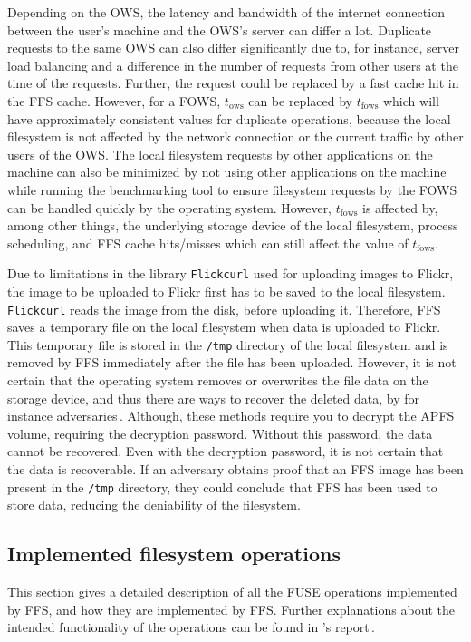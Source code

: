 Depending on the \gls{OWS}, the latency and bandwidth of the internet connection between the user's machine and the \gls{OWS}'s server can differ a lot. Duplicate requests to the same \gls{OWS} can also differ significantly due to, for instance, server load balancing and a difference in the number of requests from other users at the time of the requests. Further, the request could be replaced by a fast cache hit in the \gls{FFS} cache. However, for a \gls{FOWS}, $t_\text{ows}$ can be replaced by $t_\text{fows}$ which will have approximately consistent values for duplicate operations, because the local filesystem is not affected by the network connection or the current traffic by other users of the \gls{OWS}. The local filesystem requests by other applications on the machine can also be minimized by not using other applications on the machine while running the benchmarking tool to ensure filesystem requests by the \gls{FOWS} can be handled quickly by the operating system. However, $t_\text{fows}$ is affected by, among other things, the underlying storage device of the local filesystem, process scheduling, and \gls{FFS} cache hits/misses which can still affect the value of $t_\text{fows}$.

Due to limitations in the library \texttt{Flickcurl} used for uploading images to Flickr, the image to be uploaded to Flickr first has to be saved to the local filesystem. \texttt{Flickcurl} reads the image from the disk, before uploading it. Therefore, \gls{FFS} saves a temporary file on the local filesystem when data is uploaded to Flickr. This temporary file is stored in the \texttt{/tmp} directory of the local filesystem and is removed by \gls{FFS} immediately after the file has been uploaded. However, it is not certain that the operating system removes or overwrites the file data on the storage device, and thus there are ways to recover the deleted data, by for instance adversaries\,\cite{llcsysdevlaboratoriesHowRecoverData2022,cedricAPFSDataRecovery2022,santosHowRecoverData2021}. Although, these methods require you to decrypt the \gls{APFS} volume, requiring the decryption password. Without this password, the data cannot be recovered. Even with the decryption password, it is not certain that the data is recoverable. If an adversary obtains proof that an \gls{FFS} image has been present in the \texttt{/tmp} directory, they could conclude that \gls{FFS} has been used to store data, reducing the deniability of the filesystem.

\subsection{Implemented filesystem operations}
\label{subsec:file_op}
This section gives a detailed description of all the \gls{FUSE} operations implemented by \gls{FFS}, and how they are implemented by \gls{FFS}. Further explanations about the intended functionality of the operations can be found in \citeauthor{kuenningCS135FUSEDocumentation2010}'s report\,\cite{kuenningCS135FUSEDocumentation2010}. 

